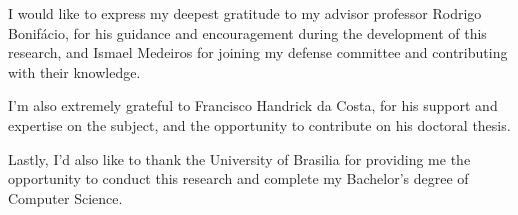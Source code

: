 I would like to express my deepest gratitude to my advisor professor Rodrigo Bonifácio, for his guidance and encouragement during the development of this research, and Ismael Medeiros for joining my defense committee and contributing with their knowledge.

I'm also extremely grateful to Francisco Handrick da Costa, for his support and expertise on the subject, and the opportunity to contribute on his doctoral thesis.

Lastly, I'd also like to thank the University of Brasilia for providing me the opportunity to conduct this research and complete my Bachelor's degree of Computer Science.